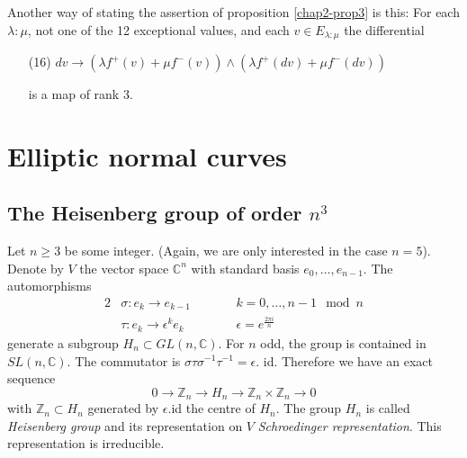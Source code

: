 Another way of stating the assertion of proposition \ref{chap2-prop3}
is this: For each $\lambda:\mu$, not one of the 12 exceptional values,
and each $v\in E_{\lambda:\mu}$ the differential
\begin{itemize}
\item[(16)] $dv\to (\lambda f^{+}(v)+\mu f^{-}(v))\wedge (\lambda
f^{+}(dv)+\mu f^{-}(dv))$\pageoriginale

is a map of rank 3.
\end{itemize}

\section{Elliptic normal curves}\label{chap2-sec3}

\subsection{The Heisenberg group of order \texorpdfstring{$n^{3}$}{n3}}\label{chap2-sec3.1}

Let $n\geq 3$ be some integer. (Again, we are only interested in the
case $n=5$). Denote by $V$ the vector space $\mathbb{C}^{n}$ with
standard basis $e_{0},\ldots,e_{n-1}$. The automorphisms
\begin{alignat*}{2}
& \sigma:e_{k}\to e_{k-1} &\qquad& k=0,\ldots,n-1\mod n\\
& \tau:e_{k}\to \epsilon^{k}e_{k} &\qquad& \epsilon=e^{\frac{2\pi i}{n}}
\end{alignat*}
generate a subgroup $H_{n}\subset GL(n,\mathbb{C})$. For $n$ odd, the
group is contained in $SL(n,\mathbb{C})$. The commutator is
$\sigma\tau\sigma^{-1}\tau^{-1}=\epsilon$. id. Therefore we have an
exact sequence
$$
0\to \mathbb{Z}_{n}\to H_{n}\to \mathbb{Z}_{n}\times \mathbb{Z}_{n}\to 0
$$
with $\mathbb{Z}_{n}\subset H_{n}$ generated by $\epsilon$.id the
centre of $H_{n}$. The group $H_{n}$ is called {\em Heisenberg group}
and its representation on $V$ {\em Schroedinger representation}. This
representation is irreducible.

